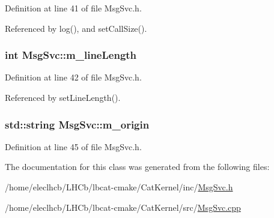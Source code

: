 Definition at line 41 of file MsgSvc.h.

Referenced by log(), and setCallSize().\hypertarget{classMsgSvc_a63c500a8e8573e6e68e0c2966920ddaa}{
\subsubsection[{m\_\-lineLength}]{\setlength{\rightskip}{0pt plus 5cm}int {\bf MsgSvc::m\_\-lineLength}}}
\label{classMsgSvc_a63c500a8e8573e6e68e0c2966920ddaa}


Definition at line 42 of file MsgSvc.h.

Referenced by setLineLength().\hypertarget{classMsgSvc_a2bf08fec17ae56486896dc6934528442}{
\subsubsection[{m\_\-origin}]{\setlength{\rightskip}{0pt plus 5cm}std::string {\bf MsgSvc::m\_\-origin}}}
\label{classMsgSvc_a2bf08fec17ae56486896dc6934528442}


Definition at line 45 of file MsgSvc.h.

The documentation for this class was generated from the following files:\begin{DoxyCompactItemize}
\item 
/home/eleclhcb/LHCb/lbcat-\/cmake/CatKernel/inc/\hyperlink{MsgSvc_8h}{MsgSvc.h}\item 
/home/eleclhcb/LHCb/lbcat-\/cmake/CatKernel/src/\hyperlink{MsgSvc_8cpp}{MsgSvc.cpp}\end{DoxyCompactItemize}
